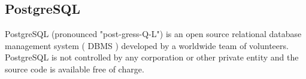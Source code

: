\subsection{PostgreSQL}
PostgreSQL (pronounced "post-gress-Q-L") is an open source relational database management system ( DBMS ) developed by a worldwide team of volunteers. PostgreSQL is not controlled by any corporation or other private entity and the source code is available free of charge.

